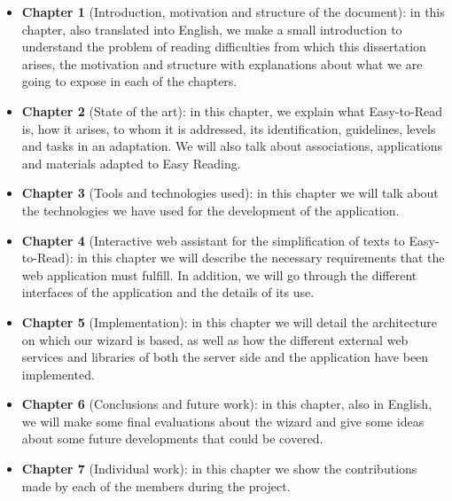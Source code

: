  \setlength{\parskip}{10pt}
 \begin{itemize}
\item {\textbf{Chapter 1}} (Introduction, motivation and structure of the document): in this chapter, also translated into English, we make a small introduction to understand the problem of reading difficulties from which this dissertation arises, the motivation and structure with explanations about what we are going to expose in each of the chapters.

 \setlength{\parskip}{10pt}
 
\item {\textbf{Chapter 2}} (State of the art): in this chapter, we explain what Easy-to-Read is, how it arises, to whom it is addressed, its identification, guidelines, levels and tasks in an adaptation. We will also talk about associations, applications and materials adapted to Easy Reading. 

 \setlength{\parskip}{10pt}

\item {\textbf{Chapter 3}} (Tools and technologies used): in this chapter we will talk about the technologies we have used for the development of the application.

 \setlength{\parskip}{10pt}

\item {\textbf{Chapter 4}} (Interactive web assistant for the simplification of texts to Easy-to-Read): in this chapter we will describe the necessary requirements that the web application must fulfill. In addition, we will go through the different interfaces of the application and the details of its use. 

 \setlength{\parskip}{10pt}

\item {\textbf{Chapter 5}} (Implementation): in this chapter we will detail the architecture on which our wizard is based, as well as how the different external web services and libraries of both the server side and the application have been implemented. 

 \setlength{\parskip}{10pt}

\item{\textbf{Chapter 6}} (Conclusions and future work): in this chapter, also in English, we will make some final evaluations about the wizard and give some ideas about some future developments that could be covered.

 \setlength{\parskip}{10pt}

\item{\textbf{Chapter 7}} (Individual work): in this chapter we show the contributions made by each of the members during the project.

\end{itemize}







